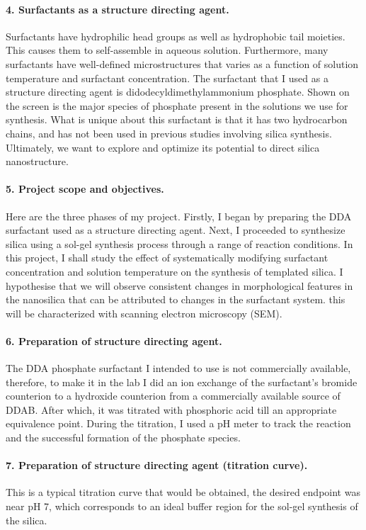 \documentclass[a4paper,12pt]{article}
\begin{document}
	\paragraph{4. Surfactants as a structure directing agent.}Surfactants have hydrophilic head groups as well as hydrophobic tail moieties. This causes them to self-assemble in aqueous solution. Furthermore, many surfactants have well-defined microstructures that varies as a function of solution temperature and surfactant concentration.
\bigbreak
The surfactant that I used as a structure directing agent is didodecyldimethylammonium phosphate. Shown on the screen is the major species of phosphate present in the solutions we use for synthesis. What is unique about this surfactant is that it has two hydrocarbon chains, and has not been used in previous studies involving silica synthesis. Ultimately, we want to explore and optimize its potential to direct silica nanostructure. 

\paragraph{5. Project scope and objectives.}Here are the three phases of my project. Firstly, I began by preparing the DDA surfactant used as a structure directing agent. Next, I proceeded to synthesize silica using a sol-gel synthesis process through a range of reaction conditions. In this project, I shall study the effect of systematically modifying surfactant concentration and solution temperature on the synthesis of templated silica. I hypothesise that we will observe consistent changes in morphological features in the nanosilica that can be attributed to changes in the surfactant system. this will be characterized with scanning electron microscopy (SEM).

\paragraph{6. Preparation of structure directing agent.}The DDA phosphate surfactant I intended to use is not commercially available, therefore, to make it in the lab I did an ion exchange of the surfactant's bromide counterion to a hydroxide counterion from a commercially available source of DDAB.
\bigbreak
After which, it was titrated with phosphoric acid till an appropriate equivalence point. During the titration, I used a pH meter to track the reaction and the successful formation of the phosphate species.


\paragraph{7. Preparation of structure directing agent (titration curve).}This is a typical titration curve that would be obtained, the desired endpoint was near pH 7, which corresponds to an ideal buffer region for the sol-gel synthesis of the silica.
\end{document}
